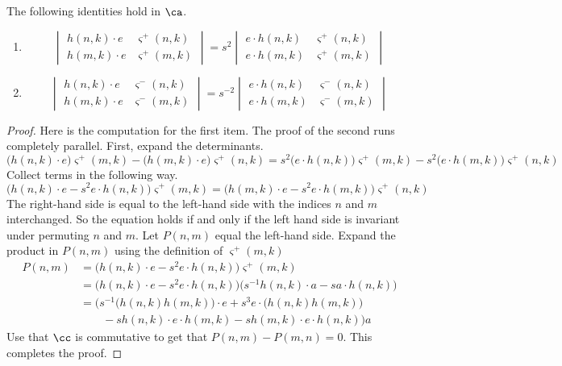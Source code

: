 
\begin{lemma} \label{lemma:detgymnastics3}
The following identities hold in $\ca$. 
\leavevmode 
\begin{enumerate}
\item
\begin{equation*}
\begin{vmatrix}
h(n, k) \cdot e & \varsigma^+ (n, k) \\
h(m, k) \cdot e & \varsigma^+ (m, k)
\end{vmatrix}
= s^2
\begin{vmatrix}
e \cdot h(n, k) & \varsigma^+ (n, k) \\
e \cdot h(m, k) & \varsigma^+ (m, k)
\end{vmatrix}
\end{equation*}
\item
\begin{equation*}
\begin{vmatrix}
h(n, k) \cdot e & \varsigma^- (n, k) \\
h(m, k) \cdot e & \varsigma^- (m, k) 
\end{vmatrix}
= s^{-2}
\begin{vmatrix}
e \cdot h(n, k) & \varsigma^- (n, k) \\
e \cdot h(m, k) & \varsigma^- (m, k) 
\end{vmatrix}
\end{equation*}
\end{enumerate}
\end{lemma}

\begin{proof}
Here is the computation for the first item. The proof of the second runs completely parallel. First, expand the determinants.
\[
\big( h(n, k) \cdot e \big) \varsigma^+ (m, k) - \big( h(m, k) \cdot e \big) \varsigma^+ (n, k) = s^2 \big( e \cdot h(n, k) \big) \varsigma^+ (m, k) - s^2 \big( e \cdot h(m, k) \big) \varsigma^+ (n, k)
\]
Collect terms in the following way.
\[
\big( h(n, k) \cdot e - s^2 e \cdot h(n, k) \big) \varsigma^+ (m, k) = \big( h(m, k) \cdot e - s^2 e \cdot h(m, k) \big) \varsigma^+(n, k)
\]
The right-hand side is equal to the left-hand side with the indices $n$ and $m$ interchanged. So the equation holds if and only if the left hand side is invariant under permuting $n$ and $m$. Let $P(n,m)$ equal the left-hand side. Expand the product in $P(n, m)$ using the definition of $\varsigma^+(m, k)$
\begin{align*}
P(n, m) & = \big( h(n, k) \cdot e - s^2 e \cdot h(n, k) \big) \varsigma^+ (m, k) \\
& = \big( h(n, k) \cdot e - s^2 e \cdot h(n, k) \big) \big( s^{-1} h(n, k) \cdot a - s a \cdot h(n, k) \big) \\
& = \Big( s^{-1} \big( h(n, k) h(m, k) \big) \cdot e + s^3 e \cdot \big( h(n, k) h(m, k) \big) \\
& \qquad  - s h(n, k) \cdot e \cdot h(m, k) - s h(m, k) \cdot e \cdot h(n, k) \Big) a
\end{align*}
Use that $\cc$ is commutative to get that $P(n, m) - P(m, n) = 0$. This completes the proof. 
\end{proof}

